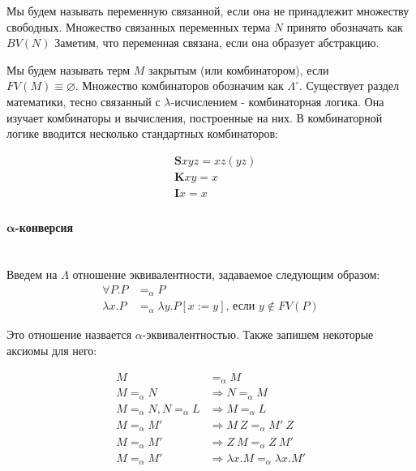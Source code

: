 \documentclass[lambda.tex]{subfiles}
\begin{document}
Мы будем называть переменную связанной, если она не принадлежит множеству свободных. Множество связанных переменных терма $N$ принято обозначать как $BV(N)$ Заметим, что переменная связана, если она образует абстракцию.

Мы будем называть терм $M$ закрытым (или комбинатором), если\\ \(FV(M) \equiv \varnothing\). Множество комбинаторов обозначим как $\Lambda^\circ$. Существует раздел математики, тесно связанный с $\lambda$-исчислением - комбинаторная логика. Она изучает комбинаторы и вычисления, построенные на них. В комбинаторной логике вводится несколько стандартных комбинаторов:

\begin{align*}
	&\boldsymbol{S}xyz = xz(yz)\\
	&\boldsymbol{K}xy = x\\
    &\boldsymbol{I}x = x\\
\end{align*}


\newpage
\paragraph{$\boldsymbol{\alpha}$-конверсия} %
\label{par:aplha conversion} ~\\

Введем на $\Lambda$ отношение эквивалентности, задаваемое следующим образом:
\begin{align*}
	\forall P.P &=_\alpha P\\
	\lambda x.P &=_\alpha \lambda y.P[x:=y] \text{, если } y \not\in FV(P)
\end{align*}

Это отношение назвается $\alpha$-эквивалентностью. Также запишем некоторые аксиомы для него:

\begin{align*}
	M &=_\alpha M\\
	M =_\alpha N &\Rightarrow N =_\alpha M\\
	M =_\alpha N, N =_\alpha L &\Rightarrow M =_\alpha L\\
	M =_\alpha M' &\Rightarrow M\ Z =_\alpha M'\ Z\\
	M =_\alpha M' &\Rightarrow Z\ M =_\alpha Z\ M'\\
	M =_\alpha M' &\Rightarrow \lambda x.M =_\alpha \lambda x.M'
\end{align*}
\end{document}
